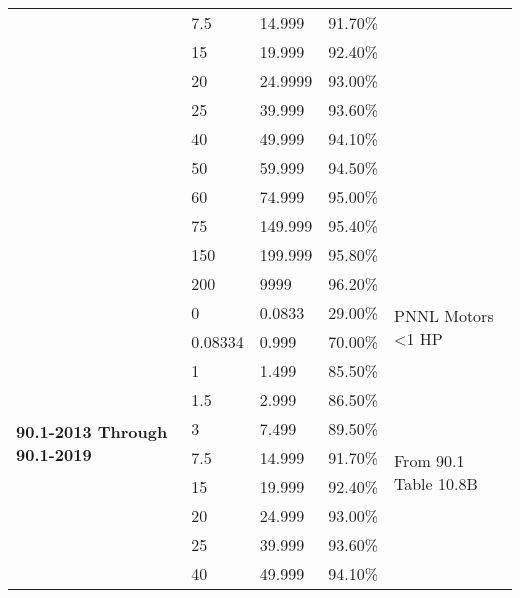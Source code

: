 \begin{table}[htbp]
\begin{tabular}{|p{1.4cm}|p{1.5cm}|p{1.5cm}|p{1.5cm}|p{2cm}|}
 & 7.5     & 14.999  & 91.70\% &                                           \\ \cline{2-4}
 & 15      & 19.999  & 92.40\% &                                           \\ \cline{2-4}
 & 20      & 24.9999 & 93.00\% &                                           \\ \cline{2-4}
 & 25      & 39.999  & 93.60\% &                                           \\ \cline{2-4}
 & 40      & 49.999  & 94.10\% &                                           \\ \cline{2-4}
 & 50      & 59.999  & 94.50\% &                                           \\ \cline{2-4}
 & 60      & 74.999  & 95.00\% &                                           \\ \cline{2-4}
 & 75      & 149.999 & 95.40\% &                                           \\ \cline{2-4}
 & 150     & 199.999 & 95.80\% &                                           \\ \cline{2-4}
 & 200     & 9999    & 96.20\% &                                           \\ \cline{1-4} \cline{5-5} 
\multirow{17}{*}{\parbox{1.4cm}{\textbf{90.1-2013 Through 90.1-2019}}}
 & 0       &  0.0833 & 29.00\% &  \multirow{2}{*}{PNNL Motors \textless 1 HP} \\ \cline{2-4}
 & 0.08334 & 0.999   & 70.00\% &                                             \\ \cline{2-4} \cline{5-5} 
 & 1       & 1.499   & 85.50\% & \multirow{15}{*}{\parbox{2cm}{From 90.1 Table 10.8B}} \\ \cline{2-4}
 & 1.5     & 2.999   & 86.50\% &                                           \\ \cline{2-4}
 & 3       & 7.499   & 89.50\% &                                           \\ \cline{2-4}
 & 7.5     & 14.999  & 91.70\% &                                           \\ \cline{2-4}
 & 15      & 19.999  & 92.40\% &                                           \\ \cline{2-4}
 & 20      & 24.999  & 93.00\% &                                           \\ \cline{2-4}
 & 25      & 39.999  & 93.60\% &                                           \\ \cline{2-4}
 & 40      & 49.999  & 94.10\% &                                           \\ \cline{2-4}

\end{tabular}
\end{table}
